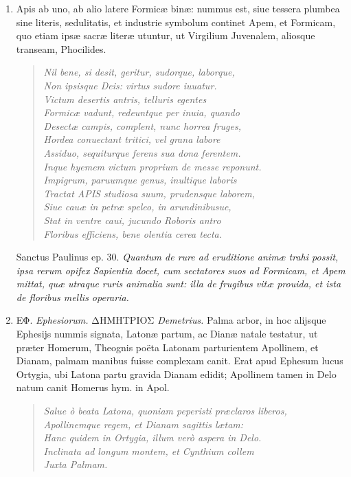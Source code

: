 \documentclass[a4paper, 11pt, oneside, polutonikogreek, latin]{article}
\begin{document}
\begin{enumerate}
    \item Apis ab uno, ab alio latere Formicæ binæ: nummus est, siue tessera plumbea sine literis, sedulitatis, et industrie symbolum continet Apem, et Formicam, quo etiam ipsæ sacræ literæ utuntur, ut Virgilium Juvenalem, aliosque transeam, Phocilides.
    
    \begin{quote}
    \emph{Nil bene, si desit, geritur, sudorque, laborque,}\\
    \emph{Non ipsisque Deis: virtus sudore iuuatur.}\\
    \emph{Victum desertis antris, telluris egentes}\\
    \emph{Formicæ vadunt, redeuntque per inuia, quando}\\
    \emph{Desectæ campis, complent, nunc horrea fruges,}\\
    \emph{Hordea conuectant tritici, vel grana labore}\\
    \emph{Assiduo, sequiturque ferens sua dona ferentem.}\\
    \emph{Inque hyemem victum proprium de messe reponunt.}\\
    \emph{Impigrum, paruumque genus, inultique laboris}\\
    \emph{Tractat APIS studiosa suum, prudensque laborem,}\\
    \emph{Siue cauæ in petræ speleo, in arundinibusue,}\\
    \emph{Stat in ventre caui, jucundo Roboris antro}\\
    \emph{Floribus efficiens, bene olentia cerea tecta.}\\
    \end{quote}
    
    Sanctus Paulinus ep. 30. \emph{Quantum de rure ad eruditione animæ trahi possit, ipsa rerum opifex Sapientia docet, cum sectatores suos ad Formicam, et Apem mittat, quæ utraque ruris animalia sunt: illa de frugibus vitæ prouida, et ista de floribus mellis operaria.}

    \item EΦ. \emph{Ephesiorum.} ΔHMHTPIOΣ \emph{Demetrius.} Palma arbor, in hoc alijsque Ephesijs nummis signata, Latonæ partum, ac Dianæ natale testatur, ut præter Homerum, Theognis poëta Latonam parturientem Apollinem, et Dianam, palmam manibus fuisse complexam canit. Erat apud Ephesum lucus Ortygia, ubi Latona partu gravida Dianam edidit; Apollinem tamen in Delo natum canit Homerus hym. in Apol.
    
    \begin{quote}
    \emph{Salue ò beata Latona, quoniam peperisti præclaros liberos,}\\
    \emph{Apollinemque regem, et Dianam sagittis lætam:}\\
    \emph{Hanc quidem in Ortygia, illum verò aspera in Delo.}\\
    \emph{Inclinata ad longum montem, et Cynthium collem}\\
    \emph{Juxta Palmam.}\\
    \end{quote}
    

\end{enumerate}
\end{document}
